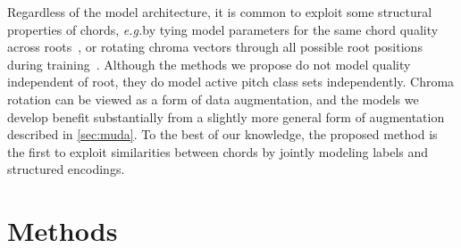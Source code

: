 \documentclass{article}
\def\eg{\emph{e.g.\/}}
\begin{document}
Regardless of the model architecture, it is common to exploit some structural properties of chords, \eg by tying model parameters for the same chord quality across roots~\cite{humphrey2015four}, or rotating chroma vectors through all possible root positions during training~\cite{cho2014improved}.
Although the methods we propose do not model quality independent of root, they do model active pitch class sets independently.
Chroma rotation can be viewed as a form of data augmentation, and the models we develop benefit substantially from a slightly more general form of augmentation described in \cref{sec:muda}.
To the best of our knowledge, the proposed method is the first to exploit similarities between chords by jointly modeling labels and structured encodings.











\section{Methods}
\label{sec:methods}



\end{document}
